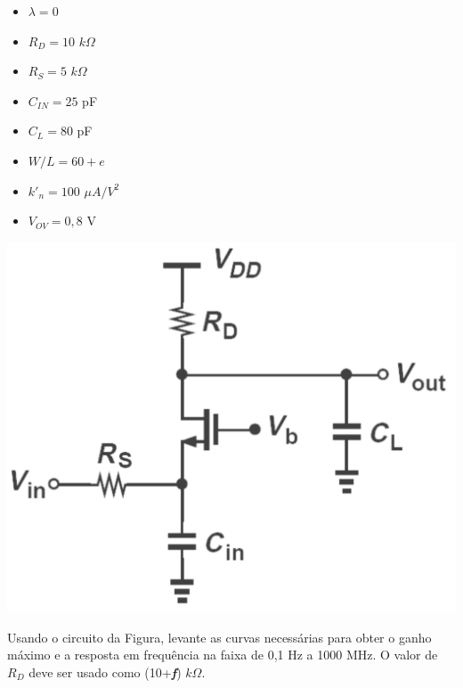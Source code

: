 \documentclass[addpoints]{exam}
\begin{document}
\begin{questions}
\begin{minipage}[m]{0.3\textwidth}
\begin{itemize}
    \item $\lambda = 0$
    \item $R_D = 10$ $k\Omega$
    \item $R_S = 5$ $k\Omega$
    \item $C_{IN} = 25$ pF
    \item $C_L = 80$ pF
    \item $W/L = 60+e$
    \item $k'_n = 100$ $\mu A/V^2$
    \item $V_{OV} = 0,8$ V
\end{itemize}
\end{minipage}
\hspace{5mm}
\begin{minipage}[m]{0.4\textwidth}
\includegraphics[width=\textwidth]{imagens/2.png}
\end{minipage}

\question[2] Usando o circuito da Figura, levante as curvas necessárias para obter o ganho máximo e a resposta em frequência na faixa de 0,1 Hz a 1000 MHz. O valor de $R_D$ deve ser usado como (10+\textit{\textbf{f}}) $k\Omega$.

\end{questions}
\end{document}
